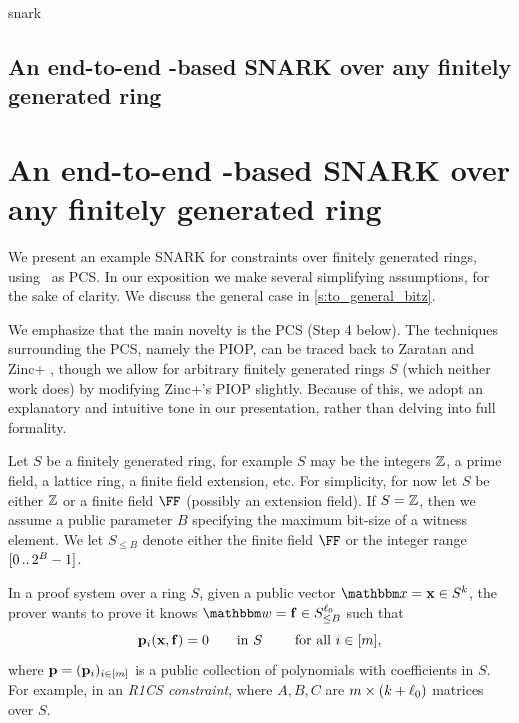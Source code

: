 \begin{lncsappendix}{snark}
\iflncs\subsection{An end-to-end \ftwoz-based SNARK over  any finitely generated ring}\label{s:to_snark}\else\section{An end-to-end \ftwoz-based SNARK over  any finitely generated ring}\label{s:to_snark}\fi




We present an example SNARK for constraints over finitely generated rings, using \ftwoz\ as PCS.  In our exposition we make several simplifying assumptions, for the sake of clarity. We discuss the general case in \cref{s:to_general_bitz}. 

We emphasize that the main novelty is the PCS (Step 4 below). The techniques surrounding the PCS, namely the PIOP, can be traced back to Zaratan and Zinc+ \cite{zincplus,zaratan}, though we allow for arbitrary finitely generated rings $S$ (which neither work does) by modifying Zinc+'s PIOP slightly.  Because of this, we adopt an explanatory and intuitive tone in our presentation, rather than delving into full formality.

    
Let  $S$ be a finitely generated ring, for example $S$ may be the integers $\mathbb{Z}$, a prime field, a lattice ring, a finite field extension, etc. For simplicity, for now let $S$ be either $\mathbb{Z}$ or a finite field $\FF$ (possibly an extension field).  If $S=\mathbb{Z}$, then we assume a public parameter $B$ specifying the maximum bit-size of a witness element. We let $S_{\leq B}$ denote either the finite field $\FF$ or the integer range $[0 \, .. \, 2^B-1]$.

In a proof system over a ring $S$, given a public vector $\inp=\xx\in S^\inplen$, the prover wants to prove it knows $\wit=\bff\in S_{\leq B}^{\codedim_0}$ such that \begin{equation}\label{e:intro_eq_0}\mathbf{p}_i(\mathbf{x},\mathbf{f})=0 \qquad \text{in  } S \qquad \text{ for all } i\in [m], \end{equation} where $\mathbf{p}=(\mathbf{p}_i)_{i\in [m]}$ is a public collection of polynomials with coefficients in $S$.  For example, in an \emph{R1CS constraint}, 
where $A,B,C$ are $m\times (k + \ell_0)$ matrices over $S$. 


\end{lncsappendix}
